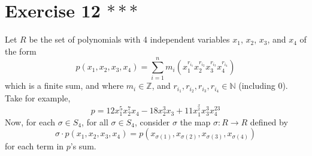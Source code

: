 \documentclass[12pt]{article}
\newcommand{\N}{\mathbb{N}}
\newcommand{\Z}{\mathbb{Z}}
\begin{document}
    \section*{Exercise 12 $***$}
    Let $R$ be the set of polynomials with 4 independent variables 
    $x_1$, $x_2$, $x_3$, and $x_4$ of the form
    \[ p(x_1, x_2, x_3, x_4) = \sum_{i = 1}^{n}
    m_i(x_1^{r_{i_1}}x_2^{r_{i_2}}x_3^{r_{i_3}}x_4^{r_{i_4}}) \]
    which is a finite sum,
    and where $m_i \in \Z$,
    and $r_{i_1}, r_{i_2}, r_{i_3}, r_{i_4} \in \N$ (including 0).
    Take for example,
    \[ p = 12x_1^5x_2^7x_4 - 18x_2^3x_3 + 11x_1^^x_2x_3^3x_4^{23} \]
    Now, for each $\sigma \in S_4$,
    for all $\sigma \in S_4$,
    consider $\sigma$ the map $\sigma: R \to R$ defined by \\
    \[\sigma \cdot p(x_1, x_2, x_3, x_4)
    = p(x_{\sigma(1)}, x_{\sigma(2)}, x_{\sigma(3)}, x_{\sigma(4)})\]
    for each term in $p$'s sum.
\end{document}
